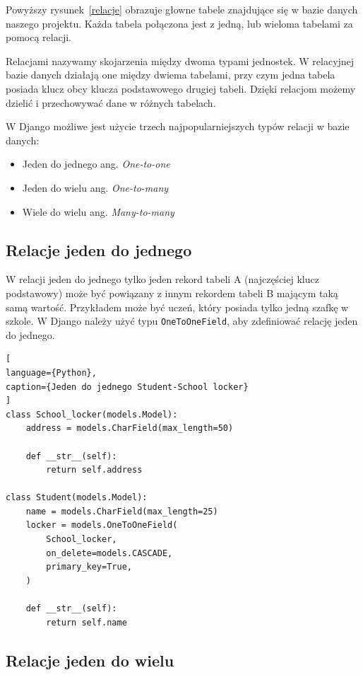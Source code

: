 \documentclass[oneside,polski,logo,indent]{amuthesis}
\begin{document}
\noindent Powyższy rysunek~\ref{relacje} obrazuje głowne tabele znajdujące się w bazie danych naszego projektu. Każda tabela połączona jest z jedną, lub wieloma tabelami za pomocą relacji.

Relacjami nazywamy skojarzenia między dwoma typami jednostek. W relacyjnej bazie danych działają one między dwiema tabelami, przy czym jedna tabela posiada klucz obcy klucza podstawowego drugiej tabeli. Dzięki relacjom możemy dzielić i przechowywać dane w różnych tabelach.

W Django możliwe jest użycie trzech najpopularniejszych typów relacji w bazie danych:
\begin{itemize}
\item Jeden do jednego ang. \emph{One-to-one}
\item Jeden do wielu ang. \emph{One-to-many}
\item Wiele do wielu ang. \emph{Many-to-many}

\end{itemize}


\begin{center}
\subsection{Relacje jeden do jednego}
\end{center}

W relacji jeden do jednego tylko jeden rekord tabeli A (najczęściej klucz podstawowy) może być powiązany z innym rekordem tabeli B mającym taką samą wartość. Przykładem może być uczeń, który posiada tylko jedną szafkę w szkole.
W Django należy użyć typu \texttt{OneToOneField}, aby zdefiniować relację jeden do jednego.
\begin{lstlisting}[
language={Python},
caption={Jeden do jednego Student-School locker}
]
class School_locker(models.Model):
    address = models.CharField(max_length=50)

    def __str__(self):
        return self.address

class Student(models.Model):
    name = models.CharField(max_length=25)
    locker = models.OneToOneField(
        School_locker,
        on_delete=models.CASCADE,
        primary_key=True,
    )

    def __str__(self):
        return self.name
\end{lstlisting}

\begin{center}
\subsection{Relacje jeden do wielu}
\end{center}
\end{document}
